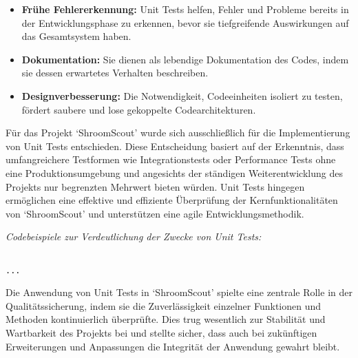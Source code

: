 \documentclass[../main.tex]{subfiles}
\begin{document}
\begin{itemize}

	\item \textbf{Frühe Fehlererkennung:}
	      Unit Tests helfen, Fehler und Probleme bereits in der Entwicklungsphase zu erkennen, bevor sie tiefgreifende Auswirkungen auf das Gesamtsystem haben.

	\item \textbf{Dokumentation:}
	      Sie dienen als lebendige Dokumentation des Codes, indem sie dessen erwartetes Verhalten beschreiben.

	\item \textbf{Designverbesserung:}
	      Die Notwendigkeit, Codeeinheiten isoliert zu testen, fördert saubere und lose gekoppelte Codearchitekturen.

\end{itemize}

Für das Projekt `ShroomScout' wurde sich ausschließlich für die Implementierung von Unit Tests entschieden. Diese Entscheidung basiert auf der Erkenntnis,
dass umfangreichere Testformen wie Integrationstests oder Performance Tests ohne eine Produktionsumgebung und angesichts der ständigen Weiterentwicklung des
Projekts nur begrenzten Mehrwert bieten würden. Unit Tests hingegen er\-mög\-lich\-en eine effektive und effiziente Überprüfung der Kernfunktionalitäten von
`ShroomScout' und unterstützen eine agile Entwicklungsmethodik.

\textit{Codebeispiele zur Verdeutlichung der Zwecke von Unit Tests:}

\begin{verbatim}

...

\end{verbatim}

Die Anwendung von Unit Tests in `ShroomScout' spielte eine zentrale Rolle in der Qua\-li\-täts\-sich\-e\-rung, indem sie die Zuverlässigkeit einzelner
Funktionen und Methoden kontinuierlich überprüfte. Dies trug wesentlich zur Stabilität und Wartbarkeit des Projekts bei und stellte sicher, dass auch bei
zukünftigen Erweiterungen und Anpassungen die Integrität der Anwendung gewahrt bleibt.
\end{document}
